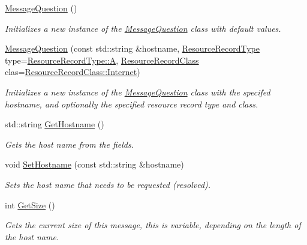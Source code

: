\begin{DoxyCompactItemize}
\item 
\hyperlink{class_senergy_1_1_dns_1_1_message_question_a956458fba0c9b96fbd78408250095148}{Message\-Question} ()
\begin{DoxyCompactList}\small\item\em Initializes a new instance of the \hyperlink{class_senergy_1_1_dns_1_1_message_question}{Message\-Question} class with default values. \end{DoxyCompactList}\item 
\hyperlink{class_senergy_1_1_dns_1_1_message_question_a974c091de6a0f0d46aa82125db2f4517}{Message\-Question} (const std\-::string \&hostname, \hyperlink{namespace_senergy_1_1_dns_a590bfd748c955364770f5ce358d9dfe0}{Resource\-Record\-Type} type=\hyperlink{namespace_senergy_1_1_dns_a590bfd748c955364770f5ce358d9dfe0a7fc56270e7a70fa81a5935b72eacbe29}{Resource\-Record\-Type\-::\-A}, \hyperlink{namespace_senergy_1_1_dns_a953f153bc411213d621d00c1e1b3eb9d}{Resource\-Record\-Class} clas=\hyperlink{namespace_senergy_1_1_dns_a953f153bc411213d621d00c1e1b3eb9dac8205c7636e728d448c2774e6a4a944b}{Resource\-Record\-Class\-::\-Internet})
\begin{DoxyCompactList}\small\item\em Initializes a new instance of the \hyperlink{class_senergy_1_1_dns_1_1_message_question}{Message\-Question} class with the specifed hostname, and optionally the specified resource record type and class. \end{DoxyCompactList}\item 
std\-::string \hyperlink{class_senergy_1_1_dns_1_1_message_question_a5fa467b516be4914f865bc5d053e98be}{Get\-Hostname} ()
\begin{DoxyCompactList}\small\item\em Gets the host name from the fields. \end{DoxyCompactList}\item 
void \hyperlink{class_senergy_1_1_dns_1_1_message_question_a239d21d940aa38b8d953ff29b400b9cf}{Set\-Hostname} (const std\-::string \&hostname)
\begin{DoxyCompactList}\small\item\em Sets the host name that needs to be requested (resolved). \end{DoxyCompactList}\item 
int \hyperlink{class_senergy_1_1_dns_1_1_message_question_a0a007a1d002a37189ce0f8c943335216}{Get\-Size} ()
\begin{DoxyCompactList}\small\item\em Gets the current size of this message, this is variable, depending on the length of the host name. \end{DoxyCompactList}\item 

\end{DoxyCompactItemize}
